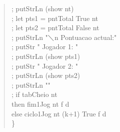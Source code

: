 \documentclass[a4paper,titlepage]{scrreprt}
\begin{document}
\begin{quote}
{			; putStrLn (show nt)\\
			; let pts1 = pntTotal True nt\\
			; let pts2 = pntTotal False nt\\
			; putStrLn "$\diagdown$n Pontuacao actual:"\\
			; putStr " Jogador 1: "\\
			; putStrLn (show pts1)\\
			; putStr " Jogador 2: "\\
			; putStrLn (show pts2)\\
			; putStrLn ""\\
			; if tabCheio nt\\
			then fim1Jog nt f d\\
			else ciclo1Jog nt (k+1) True f d\\
			\}
			}
		\end{quote}
\end{document}
